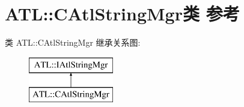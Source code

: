 \hypertarget{class_a_t_l_1_1_c_atl_string_mgr}{}\section{A\+TL\+:\+:C\+Atl\+String\+Mgr类 参考}
\label{class_a_t_l_1_1_c_atl_string_mgr}
类 A\+TL\+:\+:C\+Atl\+String\+Mgr 继承关系图\+:\begin{figure}[H]
\begin{center}
\leavevmode
\includegraphics[height=2.000000cm]{class_a_t_l_1_1_c_atl_string_mgr}
\end{center}
\end{figure}
